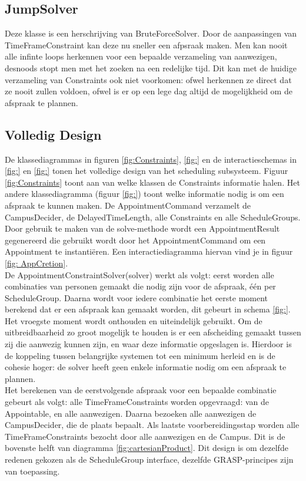 \subsection{JumpSolver}
Deze klasse is een herschrijving van BruteForceSolver. 
Door de aanpassingen van TimeFrameConstraint kan deze nu sneller een afpsraak maken. 
Men kan nooit alle infinte loops herkennen voor een bepaalde verzameling van aanwezigen, desnoods stopt men met het zoeken na een redelijke tijd.
Dit kan met de huidige verzameling van Constraints ook niet voorkomen: ofwel herkennen ze direct dat ze nooit zullen voldoen, ofwel is er op een lege dag altijd de mogelijkheid om de afspraak te plannen.

\subsection{Volledig Design}
De klassediagrammas in figuren \ref{fig:Constraints}, \ref{fig:} en de interactieschemas in \ref{fig:} en \ref{fig:} tonen het volledige design van het scheduling subsysteem. 
Figuur \ref{fig:Constraints} toont aan van welke klassen de Constraints informatie halen. 
Het andere klassediagramma (figuur \ref{fig:}) toont welke informatie nodig is om een afspraak te kunnen maken. 
De AppointmentCommand verzamelt de CampusDecider, de DelayedTimeLength, alle Constraints en alle ScheduleGroups. 
Door gebruik te maken van de solve-methode wordt een AppointmentResult gegenereerd die gebruikt wordt door het AppointmentCommand om een Appointment te instantiëren. 
Een interactiediagramma hiervan vind je in figuur \ref{fig: AppCretion}.\\

De AppointmentConstraintSolver(solver) werkt als volgt: eerst worden alle combinaties van personen gemaakt die nodig zijn voor de afspraak, één per ScheduleGroup. 
Daarna wordt voor iedere combinatie het eerste moment berekend dat er een afspraak kan gemaakt worden, dit gebeurt in schema \ref{fig:}. 
Het vroegste moment wordt onthouden en uiteindelijk gebruikt. 
Om de uitbreidbaarheid zo groot mogelijk te houden is er een afscheiding gemaakt tussen zij die aanwezig kunnen zijn, en waar deze informatie opgeslagen is. 
Hierdoor is de koppeling tussen belangrijke systemen tot een minimum herleid en is de cohesie hoger:
de solver heeft geen enkele informatie nodig om een afspraak te plannen.\\

Het berekenen van de eerstvolgende afspraak voor een bepaalde combinatie gebeurt als volgt: alle TimeFrameConstraints worden opgevraagd: van de Appointable, en alle aanwezigen. 
Daarna bezoeken alle aanwezigen de CampusDecider, die de plaats bepaalt.
Als laatste voorbereidingsstap worden alle TimeFrameConstraints bezocht door alle aanwezigen en de Campus.
Dit is de bovenste helft van diagramma \ref{fig:cartesianProduct}. 
Dit design is om dezelfde redenen gekozen als de ScheduleGroup interface, dezelfde GRASP-principes zijn van toepassing. \\

